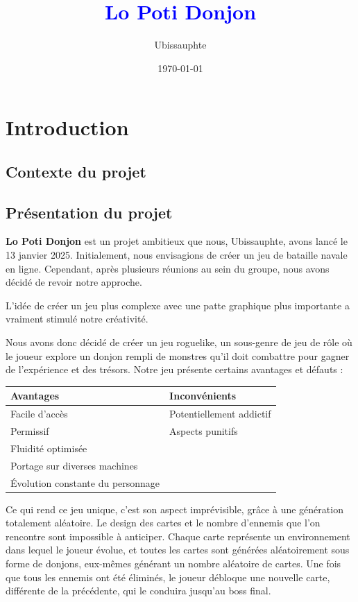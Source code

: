 \documentclass[a4paper,11pt]{article}
\begin{document}
\title{\huge{\textbf{\textcolor{blue}{Lo Poti Donjon}}}}
\author{\Large{Ubissauphte}}
\date{\today}
\maketitle
\newpage
\tableofcontents
\newpage

\section{Introduction}
\subsection{Contexte du projet}
\subsection{Présentation du projet}

\textbf{Lo Poti Donjon} est un projet ambitieux que nous, Ubissauphte, avons lancé le 13 janvier 2025. Initialement, nous envisagions de créer 
un jeu de bataille navale en ligne. Cependant, après plusieurs réunions au sein du groupe, nous avons décidé de revoir notre approche. 

L'idée de créer un jeu plus complexe avec une patte graphique plus importante a vraiment stimulé notre créativité.

Nous avons donc décidé de créer un jeu roguelike, un sous-genre de jeu de rôle où le joueur explore 
un donjon rempli de monstres qu'il doit combattre pour gagner de l'expérience et des trésors. Notre jeu présente certains avantages et défauts :

\begin{center}
\begin{tabular}{p{5cm}|p{5cm}}
\toprule
\textbf{Avantages} & \textbf{Inconvénients} \\
\midrule
Facile d'accès & Potentiellement addictif \\
Permissif & Aspects punitifs \\
Fluidité optimisée & \\
Portage sur diverses machines & \\
Évolution constante du personnage & \\
\bottomrule
\end{tabular}
\end{center}
Ce qui rend ce jeu unique, c'est son aspect imprévisible, grâce à une génération totalement aléatoire. Le design des cartes et le nombre d'ennemis que l'on rencontre sont impossible à anticiper. Chaque carte représente un environnement dans lequel le joueur évolue, et toutes les cartes sont générées aléatoirement sous forme de donjons, eux-mêmes générant un nombre aléatoire de cartes. Une fois que tous les ennemis ont été éliminés, le joueur débloque une nouvelle carte, différente de la précédente, qui le conduira jusqu'au boss final.
\end{document}
